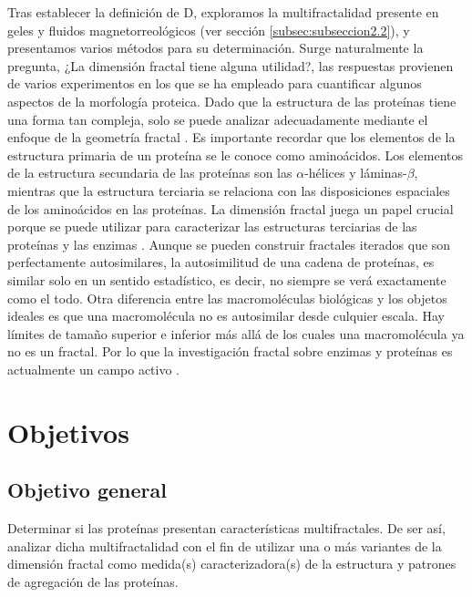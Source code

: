 \documentclass[11pt]{article}
\begin{document}
Tras establecer la definición de D, exploramos la multifractalidad presente en geles y fluidos magnetorreológicos (ver sección \ref{subsec:subseccion2.2}), y presentamos varios métodos para su determinación. Surge naturalmente la pregunta, ¿La dimensi\'{o}n fractal tiene alguna utilidad?, las respuestas provienen de varios experimentos en los que se ha empleado para cuantificar algunos aspectos de la morfolog\'{i}a proteica. Dado que la estructura de las prote\'{i}nas tiene una forma tan compleja, solo se puede analizar adecuadamente mediante el enfoque de la geometr\'{i}a fractal \cite{Mustafa1996}. 
Es importante recordar que los elementos de la estructura primaria de un prote\'{i}na se le conoce como amino\'{a}cidos. Los elementos de la estructura secundaria de las prote\'{i}nas son las $\alpha$-h\'{e}lices y l\'{a}minas-$\beta$, mientras que la estructura terciaria se relaciona con las disposiciones espaciales de los amino\'{a}cidos en las prote\'{i}nas. La dimensi\'{o}n fractal juega un papel crucial porque se puede utilizar para caracterizar las estructuras terciarias de las prote\'{i}nas y las enzimas \cite{Mustafa1996}. Aunque se pueden construir fractales iterados que son perfectamente autosimilares, la autosimilitud de una cadena de prote\'{i}nas, es similar solo en un sentido estad\'{i}stico, es decir, no siempre se ver\'{a} exactamente como el todo. Otra diferencia entre las macromol\'{e}culas biol\'{o}gicas y los objetos ideales es que una macromol\'{e}cula no es autosimilar desde culquier escala. Hay l\'{i}mites de tamaño superior e inferior m\'{a}s all\'{a} de los cuales una macromol\'{e}cula ya no es un fractal. Por lo que la investigaci\'{o}n fractal sobre enzimas y prote\'{i}nas es actualmente un campo activo \cite{Mustafa1996}. 


\clearpage


\section{Objetivos}
\subsection{Objetivo general}

Determinar si las prote\'{i}nas presentan caracter\'{i}sticas multifractales. De ser as\'{i}, analizar
dicha multifractalidad con el fin de utilizar una o m\'{a}s variantes de la
dimensi\'{o}n fractal como medida(s) caracterizadora(s)
de la estructura y patrones de agregaci\'{o}n de las prote\'{i}nas.
\end{document}
